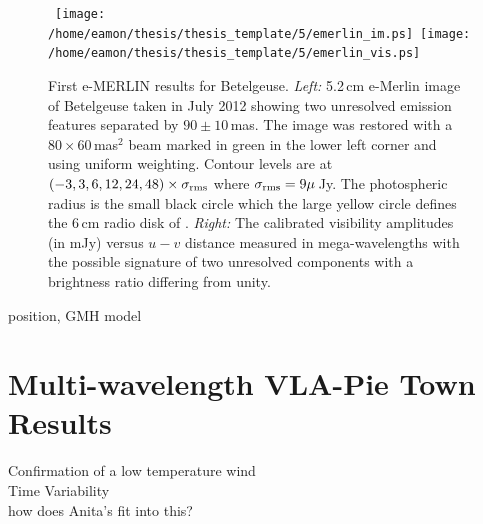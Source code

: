\begin{figure}[!ht]
\centering 
\mbox{
          \texttt{[image: /home/eamon/thesis/thesis\_template/5/emerlin\_im.ps]}
          \texttt{[image: /home/eamon/thesis/thesis\_template/5/emerlin\_vis.ps]}
          }
\caption[First e-MERLIN results for Betelgeuse.]{First e-MERLIN results for Betelgeuse. \textit{Left:} 5.2\,cm e-Merlin image of Betelgeuse taken in July 2012 showing two unresolved emission features separated by $90\pm10$\,mas. The image was restored with a $80\times 60$\,mas$^2$ beam marked in green in the lower left corner and using uniform weighting. Contour levels are at $(-3, 3, 6, 12, 24, 48)\times \sigma _{\rm{rms}}$ where $\sigma _{\rm{rms}} = 9\mu$\,Jy. The photospheric radius is the small black circle which the large yellow circle defines the 6\,cm radio disk of \cite{lim_1998}. \textit{Right:} The calibrated visibility amplitudes (in mJy) versus $u-v$ distance measured in mega-wavelengths with the possible signature of two unresolved components with a brightness ratio differing from unity. }
\label{fig:5.13}
\end{figure}

position, GMH model
\section{Multi-wavelength VLA-Pie Town Results}\label{sec:5.13}
Confirmation of a low temperature wind\\
Time Variability\\
how does Anita's fit into this?